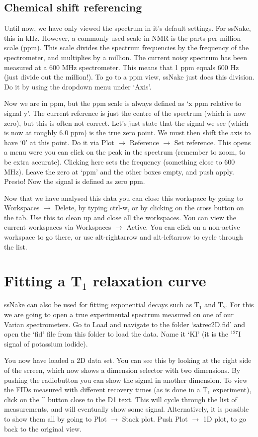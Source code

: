 \documentclass[11pt,a4paper]{article}
\begin{document}
\subsection{Chemical shift referencing}
Until now, we have only viewed the spectrum in it's default settings. For ssNake, this in kHz. However, a commonly used scale in NMR is the parts-per-million scale (ppm). This scale divides the spectrum frequencies by the frequency of the spectrometer, and multiplies by a million. The current noisy spectrum has been measured at a 600 MHz spectrometer. This means that 1 ppm equals 600 Hz (just divide out the million!). To go to a ppm view, ssNake just does this division. Do it by using the dropdown menu under `Axis'.

Now we are in ppm, but the ppm scale is always defined as `x ppm relative to signal y'. The current reference is just the centre of the spectrum (which is now zero), but this is often not correct. Let's just state that the signal we see (which is now at roughly 6.0 ppm) is the true zero point. We must then shift the axis to have `0' at this point. Do it via Plot $\rightarrow$ Reference $\rightarrow$ Set reference. This opens a menu were you can click on the peak in the spectrum (remember to zoom, to be extra accurate). Clicking here sets the frequency (something close to 600 MHz). Leave the zero at `ppm' and the other boxes empty, and push apply. Presto! Now the signal is defined as zero ppm.

Now that we have analysed this data you can close this workspace by going to Workspaces $\rightarrow$ Delete, by typing ctrl-w, or by clicking on the cross button on the tab. Use this to clean up and close all the workspaces. You can view the current workspaces via Workspaces $\rightarrow$ Active. You can click on a non-active workspace to go there, or use alt-rightarrow and alt-leftarrow to cycle through the list.

\section{Fitting a T$_1$ relaxation curve}
ssNake can also be used for fitting exponential decays such as T$_1$ and T$_2$.
For this we are going to open a true experimental spectrum measured on one of
our Varian spectrometers. Go to Load and navigate to the folder `satrec2D.fid'
and open the `fid' file from this folder to load the data. Name it `KI' (it is
the $^{127}$I signal of potassium iodide).

You now have loaded a 2D data set. You can see this by looking at the right
side of the screen, which now shows a dimension selector with two dimensions.
By pushing the radiobutton you can show the signal in another dimension. To
view the FIDs measured with different recovery times (as is done in a T$_1$
experiment), click on the \^{} button close to the D1 text. This will cycle
through the list of measurements, and will eventually show some signal.
Alternatively, it is possible to show them all by going to Plot $\rightarrow$
Stack plot. Push Plot $\rightarrow$ 1D plot, to go back to the original view.
\end{document}
